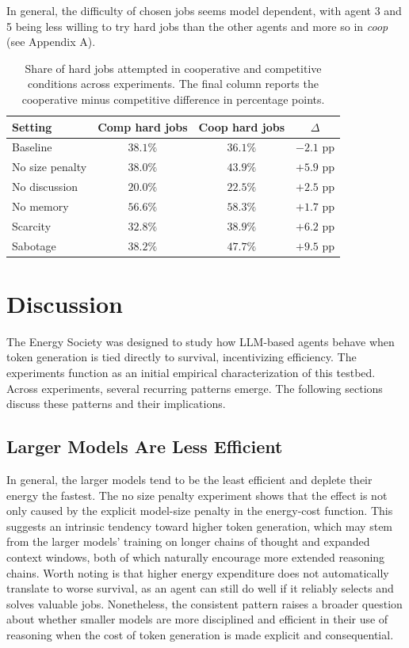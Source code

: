 \documentclass[sigconf,nonacm]{acmart}
\begin{document}
In general, the difficulty of chosen jobs seems model dependent, with agent 3 and 5 being less willing to try hard jobs than the other agents and more so in \textit{coop} (see Appendix A).

\begin{table}[H]
\centering
\small
\setlength{\tabcolsep}{5pt}
\begin{tabular}{lccc}
\toprule
Setting & Comp hard jobs & Coop hard jobs & $\Delta$ \\
\midrule
Baseline & $38.1\%$ & $36.1\%$ & $-2.1$ pp \\
No size penalty & $38.0\%$ & $43.9\%$ & $+5.9$ pp \\
No discussion & $20.0\%$ & $22.5\%$ & $+2.5$ pp \\
No memory & $56.6\%$ & $58.3\%$ & $+1.7$ pp \\
Scarcity & $32.8\%$ & $38.9\%$ & $+6.2$ pp \\
Sabotage & $38.2\%$ & $47.7\%$ & $+9.5$ pp \\
\bottomrule
\end{tabular}
\caption{Share of hard jobs attempted in cooperative and competitive conditions across experiments. The final column reports the cooperative minus competitive difference in percentage points.}
\label{tab:hard_job_share_by_condition}
\end{table}

\section{Discussion}

The Energy Society was designed to study how LLM-based agents behave when token generation is tied directly to survival, incentivizing efficiency. The experiments function as an initial empirical characterization of this testbed.
Across experiments, several recurring patterns emerge. The following sections discuss these patterns and their implications.

\subsection{Larger Models Are Less Efficient}
In general, the larger models tend to be the least efficient and deplete their energy the fastest.
The no size penalty experiment shows that the effect is not only caused by the explicit model-size penalty in the energy-cost function. 
This suggests an intrinsic tendency toward higher token generation, which may stem from the larger models' training on longer chains of thought and expanded context windows, both of which naturally encourage more extended reasoning chains.
Worth noting is that higher energy expenditure does not automatically translate to worse survival, as an agent can still do well if it reliably selects and solves valuable jobs.
Nonetheless, the consistent pattern raises a broader question about whether smaller models are more disciplined and efficient in their use of reasoning when the cost of token generation is 
made explicit and consequential.
\end{document}
